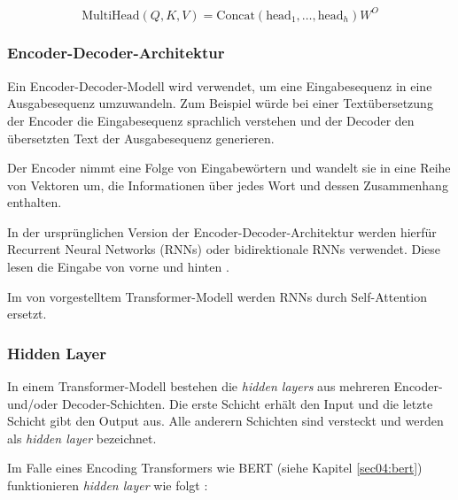 \begin{equation}
   \text{MultiHead}(Q, K, V) = \text{Concat}(\text{head}_1, \ldots, \text{head}_h) W^O 
\end{equation}


\subsubsection{Encoder-Decoder-Architektur} \label{sec:encoder_decoder_architecture}

Ein Encoder-Decoder-Modell wird verwendet, um eine Eingabesequenz in eine Ausgabesequenz umzuwandeln. 
Zum Beispiel würde bei einer Textübersetzung der Encoder die Eingabesequenz sprachlich verstehen und der Decoder den übersetzten Text der Ausgabesequenz generieren.

Der Encoder nimmt eine Folge von Eingabewörtern und wandelt sie in eine Reihe von Vektoren um, die Informationen über jedes Wort und dessen Zusammenhang enthalten.

In der ursprünglichen Version der Encoder-Decoder-Architektur werden hierfür Recurrent Neural Networks (RNNs) oder bidirektionale RNNs verwendet.
Diese lesen die Eingabe von vorne und hinten \cite{bahdanau2016neuralmachinetranslationjointly}.

Im von \cite{vaswani2023attentionneed} vorgestelltem Transformer-Modell werden RNNs durch Self-Attention ersetzt. 


\subsubsection{Hidden Layer} \label{sec:hidden_layer}

In einem Transformer-Modell \cite{vaswani2023attentionneed} bestehen die \textit{hidden layers} aus mehreren Encoder- und/oder Decoder-Schichten.
Die erste Schicht erhält den Input und die letzte Schicht gibt den Output aus. Alle anderern Schichten sind versteckt und werden
als \textit{hidden layer} bezeichnet.

Im Falle eines Encoding Transformers wie BERT (siehe Kapitel \ref{sec04:bert}) funktionieren \textit{hidden layer} wie folgt \cite{DBLP:journals/corr/abs-1810-04805}:

